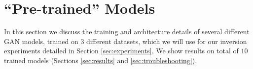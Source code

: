 \documentclass[journal]{IEEEtran}
\begin{document}









\section{``Pre-trained'' Models}
In this section we discuss the training and architecture details of several different GAN models, trained on $3$ different datasets, which we will use for our inversion experiments detailed in Section \ref{sec:experiments}. We show results on total of $10$ trained models (Sections \ref{sec:results} and \ref{sec:troubleshooting}).
\end{document}
